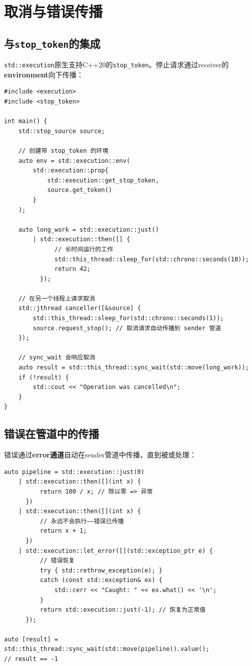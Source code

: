 \documentclass[12pt,a4paper,fontset=fandol]{ctexbook}
\newcommand{\cpp}[1]{C++#1}
\begin{document}
\chapter{取消与错误传播}

\section{与\texttt{stop\_token}的集成}

\texttt{std::execution}原生支持\cpp{}20的\texttt{stop\_token}。停止请求通过receiver的\textbf{environment}向下传播：

\begin{lstlisting}
#include <execution>
#include <stop_token>

int main() {
    std::stop_source source;

    // 创建带 stop_token 的环境
    auto env = std::execution::env(
        std::execution::prop{
            std::execution::get_stop_token,
            source.get_token()
        }
    );

    auto long_work = std::execution::just()
        | std::execution::then([] {
              // 长时间运行的工作
              std::this_thread::sleep_for(std::chrono::seconds(10));
              return 42;
          });

    // 在另一个线程上请求取消
    std::jthread canceller([&source] {
        std::this_thread::sleep_for(std::chrono::seconds(1));
        source.request_stop(); // 取消请求自动传播到 sender 管道
    });

    // sync_wait 会响应取消
    auto result = std::this_thread::sync_wait(std::move(long_work));
    if (!result) {
        std::cout << "Operation was cancelled\n";
    }
}
\end{lstlisting}

\section{错误在管道中的传播}

错误通过\textbf{error通道}自动在sender管道中传播，直到被\texttt{}或\texttt{}处理：

\begin{lstlisting}
auto pipeline = std::execution::just(0)
    | std::execution::then([](int x) {
          return 100 / x; // 除以零 => 异常
      })
    | std::execution::then([](int x) {
          // 永远不会执行——错误已传播
          return x + 1;
      })
    | std::execution::let_error([](std::exception_ptr e) {
          // 错误恢复
          try { std::rethrow_exception(e); }
          catch (const std::exception& ex) {
              std::cerr << "Caught: " << ex.what() << '\n';
          }
          return std::execution::just(-1); // 恢复为正常值
      });

auto [result] = std::this_thread::sync_wait(std::move(pipeline)).value();
// result == -1
\end{lstlisting}
\end{document}
